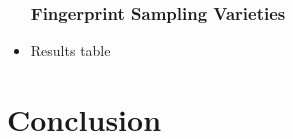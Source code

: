\documentclass[10pt]{beamer}
\begin{document}
\begin{NoHyper}
\begin{frame}
  \begin{itemize}
  \frametitle{Fingerprint Sampling Varieties}
  \item<1-> Results table
  \end{itemize}
\end{frame}

\section{Conclusion}



\end{NoHyper}
\end{document}
